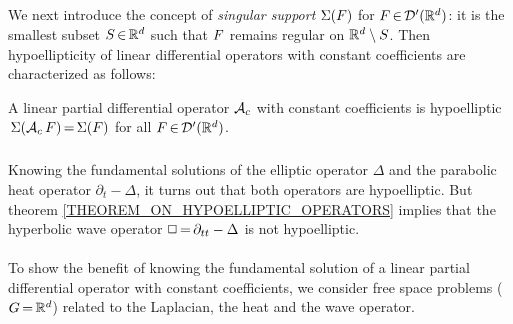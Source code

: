 \documentclass[11pt,twoside]{article}
\def\G{G}
\begin{document}
\subparagraph{}
We next introduce the concept of \textit{singular support} $\Sigma(F)$
for $F {\,\in\,} {\mathcal{D}}'({\mathbb{R}}^d)$:
it is the smallest subset $S {\,\in\,} {\mathbb{R}}^d$
such that $F$ remains regular on ${\mathbb{R}}^d \setminus S$.
Then hypoellipticity of linear differential operators
with constant coefficients are characterized as follows:

\begin{theorem1}\label{THEOREM_ON_HYPOELLIPTIC_OPERATORS}
A linear partial differential operator ${\mathcal{A}}_c$ with constant coefficients
is hypoelliptic
\iff
$\,\Sigma({\mathcal{A}}_c \, F) {\,=\,} \Sigma(F)$ for all $F {\,\in\,} {\mathcal{D}}'({\mathbb{R}}^d)$.
\end{theorem1}

\subparagraph{}
Knowing the fundamental solutions of the elliptic operator $\Delta$ and
the parabolic heat operator $\partial_t-\Delta$,
it turns out that both operators are hypoelliptic.
But theorem \ref{THEOREM_ON_HYPOELLIPTIC_OPERATORS} implies
that the hyperbolic wave operator $\Box {\,=\,} \partial_{tt}-\Delta$
is not hypoelliptic.

\paragraph{} %
To show the benefit of knowing the fundamental solution
of a linear partial differential operator with constant coefficients,
we consider free space problems ($\G \eq \Rd$)
related to the Laplacian, the heat and the wave operator.
\end{document}
